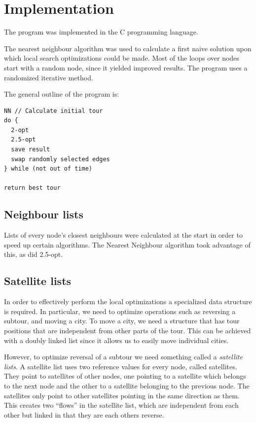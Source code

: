 \documentclass[paper=a4, fontsize=11pt,numbers=endperiod]{scrartcl} %
\numberwithin{equation}{section} %
\numberwithin{figure}{section} %
\numberwithin{table}{section} %
\begin{document}
\section{Implementation}
The program was implemented in the C programming language.

The nearest neighbour algorithm was used to calculate a first naive solution upon which local search optimizations could be made.
Most of the loops over nodes start with a random node, since it yielded improved results.
The program uses a randomized iterative method.

The general outline of the program is:

\begin{verbatim}
NN // Calculate initial tour
do {
  2-opt
  2.5-opt
  save result
  swap randomly selected edges
} while (not out of time)

return best tour
\end{verbatim}



\subsection{Neighbour lists}
Lists of every node's closest neighbours were calculated at the start in order to speed up certain algorithms.
The Nearest Neighbour algorithm took advantage of this, as did 2.5-opt.

\subsection{Satellite lists}
In order to effectively perform the local optimizations a specialized data structure is required.
In particular, we need to optimize operations such as reversing a subtour, and moving a city.
To move a city, we need a structure that has tour positions that are independent from other parts of the tour.
This can be achieved with a doubly linked list since it allows us to easily move individual cities.

However, to optimize reversal of a subtour we need something called a \emph{satellite lists}.\cite{satellite}
A satellite list uses two reference values for every node, called satellites.
They point to satellites of other nodes, one pointing to a satellite which belongs to the next node and the other to a satellite belonging to the previous node.
The satellites only point to other satellites pointing in the same direction as them.
This creates two ``flows'' in the satellite list, which are independent from each other but linked in that they are each others reverse.
\end{document}
